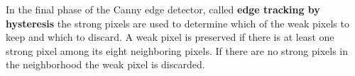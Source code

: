 In the final phase of the Canny edge detector, called \textbf{edge tracking by hysteresis} the strong pixels are used to determine which of the weak pixels to keep and which to discard. A weak pixel is preserved if there is at least one strong pixel among its eight neighboring pixels. If there are no strong pixels in the neighborhood the weak pixel is discarded.~\cite{gonzalez2008digital}

